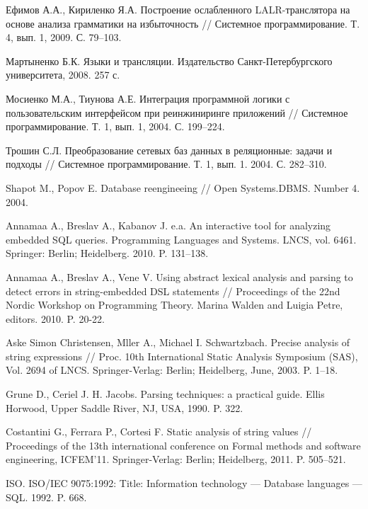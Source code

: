 \documentclass{llncs}
\begin{document}
%
%
\begin{thebibliography}{}
  
Ефимов А.А., Кириленко Я.А. Построение ослабленного LALR-транслятора на основе анализа грамматики на избыточность // Системное программирование. Т. 4, вып. 1, 2009. С. 79–103.  

Мартыненко Б.К. Языки и трансляции. Издательство Санкт-Петербургского университета, 2008. 257 с. 

Мосиенко М.А., Тиунова А.Е. Интеграция программной логики с пользовательским интерфейсом при реинжиниринге приложений // Системное программирование. Т. 1, вып. 1, 2004. С. 199–224.

Трошин С.Л. Преобразование сетевых баз данных в реляционные: задачи и подходы // Системное программирование. Т. 1, вып. 1. 2004. С. 282–310.

Shapot M., Popov E. Database reengineeing // Open Systems.DBMS. Number 4. 2004.    

Annamaa A., Breslav A., Kabanov J. e.a. An interactive tool for analyzing embedded SQL queries. Programming Languages and Systems. LNCS, vol. 6461. Springer: Berlin; Heidelberg. 2010. P. 131–138.

Annamaa A., Breslav A., Vene V. Using abstract lexical analysis and parsing to detect errors in string-embedded DSL statements // Proceedings of the 22nd Nordic Workshop on Programming Theory. Marina Walden and Luigia Petre, editors. 2010. P. 20-22.

Aske Simon Christensen, Mller A., Michael I. Schwartzbach. Precise analysis of string expressions // Proc. 10th International Static Analysis Symposium (SAS), Vol. 2694 of LNCS. Springer-Verlag: Berlin; Heidelberg, June, 2003. P. 1–18.

Grune D., Ceriel J. H. Jacobs. Parsing techniques: a practical guide. Ellis Horwood, Upper Saddle River, NJ, USA, 1990. P. 322.

Costantini G., Ferrara P., Cortesi F. Static analysis of string values // Proceedings of the 13th international conference on Formal methods and software engineering, ICFEM’11. Springer-Verlag: Berlin; Heidelberg, 2011. P. 505–521.

ISO. ISO/IEC 9075:1992: Title: Information technology — Database languages — SQL. 1992. P. 668.


\end{thebibliography}
\end{document}
